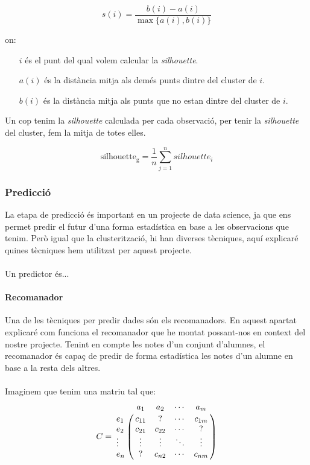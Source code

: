 \documentclass[12pt,a4paper,catalan]{article}
\begin{document}
$$ s(i) = \frac{b(i) - a(i)}{\max\{a(i),b(i)\}} $$

on:
\begin{itemize}[leftmargin=.5in]
	\item [$i$] és el punt del qual volem calcular la \textit{silhouette}.
	\item [$a(i)$] és la distància mitja als demés punts dintre del cluster de $i$.
	\item [$b(i)$] és la distància mitja als punts que no estan dintre del cluster de $i$.
\end{itemize}

Un cop tenim la \textit{silhouette} calculada per cada observació, per tenir la \textit{silhouette} del cluster, fem la mitja de totes elles.

$$ \mathrm{silhouette_g} = \frac{1}{n} \sum_{j=1}^n silhouette_i $$

\newpage

\subsubsection{Predicció}
La etapa de predicció és important en un projecte de data science, ja que ens permet predir el futur d'una forma estadística en base a les observacions que tenim. Però igual que la clusterització, hi han diverses tècniques, aquí explicaré quines tècniques hem utilitzat per aquest projecte.
\\
\\
Un predictor és...


\paragraph{Recomanador}
Una de les tècniques per predir dades són els recomanadors. En aquest apartat explicaré com funciona el recomanador que he montat possant-nos en context del nostre projecte. Tenint en compte les notes d'un conjunt d'alumnes, el recomanador és capaç de predir de forma estadística les notes d'un alumne en base a la resta dels altres.
\\
\\
Imaginem que tenim una matriu tal que:
$$
C = \bordermatrix{~ &         a_1   &    a_2   &   \cdots    &    a_m  \cr
                  e_1    &  c_{11}  &     ?    &   \cdots    &  c_{1m} \cr
                  e_2    &  c_{21}  &  c_{22}  &   \cdots    &    ?    \cr
                  \vdots &  \vdots  &  \vdots  &   \ddots    &  \vdots \cr
                  e_n    &    ?     &  c_{n2}  &   \cdots    &  c_{nm} \cr
                  }
$$
\end{document}

